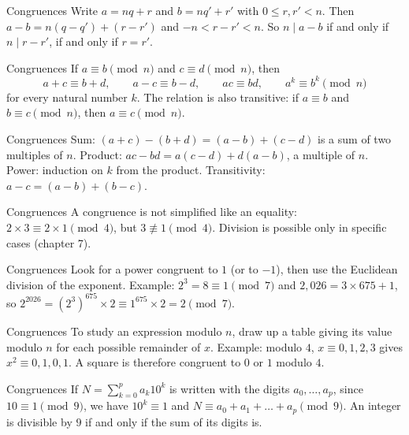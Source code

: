\documentclass[aspectratio=169,10pt]{beamer}
\begin{document}
\begin{frame}{Congruences}
Write \(a=nq+r\) and \(b=nq'+r'\) with \(0\le r,r'<n\). Then \(a-b=n(q-q')+(r-r')\) and \(-n<r-r'<n\). So \(n\mid a-b\) if and only if \(n\mid r-r'\), if and only if \(r=r'\).
\end{frame}
\begin{frame}{Congruences}
If \(a\equiv b\pmod n\) and \(c\equiv d\pmod n\), then
\[a+c\equiv b+d,\qquad a-c\equiv b-d,\qquad ac\equiv bd,\qquad a^k\equiv b^k\pmod n\]
for every natural number \(k\). The relation is also transitive: if \(a\equiv b\) and \(b\equiv c\pmod n\), then \(a\equiv c\pmod n\).
\end{frame}
\begin{frame}{Congruences}
Sum: \((a+c)-(b+d)=(a-b)+(c-d)\) is a sum of two multiples of \(n\). Product: \(ac-bd=a(c-d)+d(a-b)\), a multiple of \(n\). Power: induction on \(k\) from the product. Transitivity: \(a-c=(a-b)+(b-c)\).
\end{frame}
\begin{frame}{Congruences}
A congruence is not simplified like an equality: \(2\times3\equiv2\times1\pmod4\), but \(3\not\equiv1\pmod4\). Division is possible only in specific cases (chapter 7).
\end{frame}
\begin{frame}{Congruences}
Look for a power congruent to \(1\) (or to \(-1\)), then use the Euclidean division of the exponent. Example: \(2^3=8\equiv1\pmod7\) and \(2{,}026=3\times675+1\), so \(2^{2026}=\left(2^3\right)^{675}\times2\equiv1^{675}\times2=2\pmod7\).
\end{frame}
\begin{frame}{Congruences}
To study an expression modulo \(n\), draw up a table giving its value modulo \(n\) for each possible remainder of \(x\). Example: modulo \(4\), \(x\equiv0,1,2,3\) gives \(x^2\equiv0,1,0,1\). A square is therefore congruent to \(0\) or \(1\) modulo \(4\).
\end{frame}
\begin{frame}{Congruences}
If \(N=\sum_{k=0}^{p}a_k10^k\) is written with the digits \(a_0,\dots,a_p\), since \(10\equiv1\pmod9\), we have \(10^k\equiv1\) and \(N\equiv a_0+a_1+\dots+a_p\pmod9\). An integer is divisible by \(9\) if and only if the sum of its digits is.
\end{frame}
\end{document}
